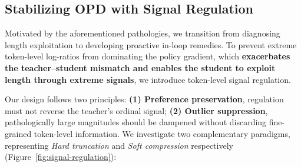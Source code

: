 \documentclass[11pt]{article}
\begin{document}

\subsection{Stabilizing OPD with Signal Regulation}        
\label{sec:regulation}


Motivated by the aforementioned pathologies, we transition from diagnosing length exploitation to developing proactive in-loop remedies. 
To prevent extreme token-level log-ratios from dominating the policy gradient, which \textbf{exacerbates the teacher–student mismatch and enables the student to exploit length through extreme signals}, we introduce token-level signal regulation.

Our design follows two principles: \textbf{(1) Preference preservation}, regulation must not reverse the teacher's ordinal signal; \textbf{(2) Outlier suppression}, pathologically large magnitudes should be dampened without discarding fine-grained token-level information.
We investigate two complementary paradigms, representing \emph{Hard truncation} and \emph{Soft compression} respectively (Figure~\ref{fig:signal-regulation}):

\end{document}
